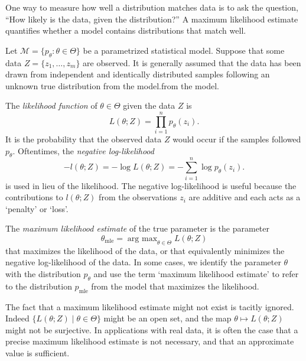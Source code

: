 \documentclass[cclicense]{hmcthesis}
\providecommand*{\ms}{\mathcal M}
\DeclareMathOperator*{\argmax}{arg\ max}
\newcommand*{\mle}{\mathrm{mle}}
\numberwithin{equation}{chapter}
\numberwithin{thmcounter}{chapter}
\begin{document}
    One way to measure how well a distribution matches data is to ask the
    question, ``How likely is the data, given the distribution?''  A maximum
    likelihood estimate quantifies whether a model contains distributions that
    match well.

    Let $\ms = \{p_\theta : \theta \in \Theta\}$ be a parametrized statistical
    model.  Suppose that some data $Z = \{z_1, \ldots, z_m\}$ are observed.  It
    is generally assumed that the data has been drawn from independent and
    identically distributed samples following an unknown true distribution from
    the model.from the model.
    
    \begin{definition}
    The \emph{likelihood function} of $\theta \in \Theta$ given the data $Z$ is
    \[
        L(\theta; Z) = \prod_{i=1}^n p_\theta(z_i).
    \]
    It is the probability that the observed data $Z$ would occur if the samples
    followed $p_\theta$.  Oftentimes, the \emph{negative log-likelihood}
    \[
        -l(\theta; Z) = -\log L(\theta; Z) = -\sum_{i=1}^n \log p_\theta(z_i).
    \]
    is used in lieu of the likelihood.  The negative log-likelihood is useful
    because the contributions to $l(\theta; Z)$ from the observations $z_i$ are
    additive and each acts as a `penalty' or `loss'.
    \end{definition}
    \begin{definition}
    The \emph{maximum likelihood estimate} of the true parameter is the
    parameter 
    \[
        \theta_\mle = \argmax_{\theta \in \Theta} L(\theta; Z)
    \]
    that maximizes the likelihood of the data, or that equivalently minimizes
    the negative log-likelihood of the data.  In some cases, we identify the
    parameter $\theta$ with the distribution $p_\theta$ and use the term
    `maximum likelihood estimate' to refer to the distribution $p_\mle$ from the
    model that maximizes the likelihood.
    \end{definition}

    \begin{note}
        The fact that a maximum likelihood estimate might not exist is tacitly
        ignored.  Indeed $\{L(\theta; Z) \mid \theta \in \Theta\}$ might be an
        open set, and the map $\theta \mapsto L(\theta; Z)$ might not be
        surjective.  In applications with real data, it is often the case that a
        precise maximum likelihood estimate is not necessary, and that an
        approximate value is sufficient.
    \end{note}
\end{document}
